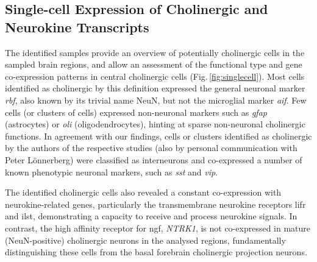 \begin{method}
\end{method}

\subsection{Single-cell Expression of Cholinergic and Neurokine Transcripts}

The identified samples provide an overview of potentially cholinergic cells in the sampled brain regions, and allow an assessment of the functional type and gene co-expression patterns in central cholinergic cells (Fig.\,\ref{fig:singlecell}). Most cells identified as cholinergic by this definition expressed the general neuronal marker \textit{\acs{rbf}}, also known by its trivial name NeuN, but not the microglial marker \textit{\acs{aif}}. Few cells (or clusters of cells) expressed non-neuronal markers such as \textit{\acs{gfap}} (astrocytes) or \textit{\acs{oli}} (oligodendrocytes), hinting at sparse non-neuronal cholinergic functions. In agreement with our findings, cells or clusters identified as cholinergic by the authors of the respective studies\cite{Zeisel2015, Tasic2016} (also by personal communication with Peter Lönnerberg) were classified as interneurons and co-expressed a number of known phenotypic neuronal markers, such as \textit{\ac{sst}} and \textit{\ac{vip}}.

The identified cholinergic cells also revealed a constant co-expression with neurokine-related genes, particularly the transmembrane neurokine receptors \ac{lifr} and \ac{ilst}, demonstrating a capacity to receive and process neurokine signals. In contrast, the high affinity receptor for \ac{ngf}, \textit{NTRK1}, is not co-expressed in mature (NeuN-positive) cholinergic neurons in the analysed regions, fundamentally distinguishing these cells from the basal forebrain cholinergic projection neurons.

